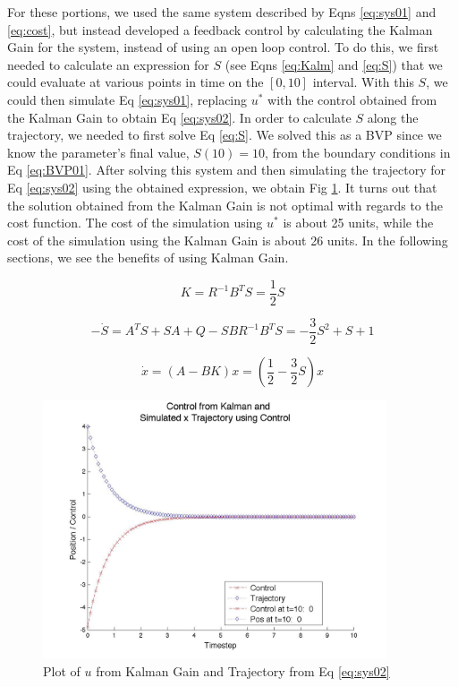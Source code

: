 \documentclass[12pt, notitlepage, letterpaper]{article}
\begin{document}
For these portions, we used the same system described by Eqns \ref{eq:sys01} and \ref{eq:cost}, but instead developed a feedback control by calculating the Kalman Gain for the system, instead of using an open loop control.  To do this, we first needed to calculate an expression for $S$ (see Eqns \ref{eq:Kalm} and \ref{eq:S}) that we could evaluate at various points in time on the $[0,10]$ interval.  With this $S$, we could then simulate Eq \ref{eq:sys01}, replacing $u^*$ with the control obtained from the Kalman Gain to obtain Eq \ref{eq:sys02}.  In order to calculate $S$ along the trajectory, we needed to first solve Eq \ref{eq:S}.  We solved this as a BVP since we know the parameter's final value, $S(10) = 10$, from the boundary conditions in Eq \ref{eq:BVP01}.  After solving this system and then simulating the trajectory for Eq \ref{eq:sys02} using the obtained expression, we obtain Fig \ref{fig:KalmSys}.  It turns out that the solution obtained from the Kalman Gain is not optimal with regards to the cost function.  The cost of the simulation using $u^*$ is about 25 units, while the cost of the simulation using the Kalman Gain is about 26 units.  In the following sections, we see the benefits of using Kalman Gain.

\begin{equation}
\label{eq:Kalm}
K = R^{-1}B^TS = \frac{1}{2}S
\end{equation}

\begin{equation}
\label{eq:S}
-\dot{S} = A^TS + SA + Q  -SBR^{-1}B^TS= -\frac{3}{2}S^2 + S + 1
\end{equation}

\begin{equation}
\label{eq:sys02}
\dot{x} = (A - BK)x = (\frac{1}{2} - \frac{3}{2}S)x
\end{equation}

\begin{figure}[h]
\begin{center}
\includegraphics[width=4in]{ClosedTrajCont0to10}
\caption{\label{fig:KalmSys} Plot of $u$ from Kalman Gain and Trajectory from Eq \ref{eq:sys02} }
\end{center}
\end{figure}
\end{document}
